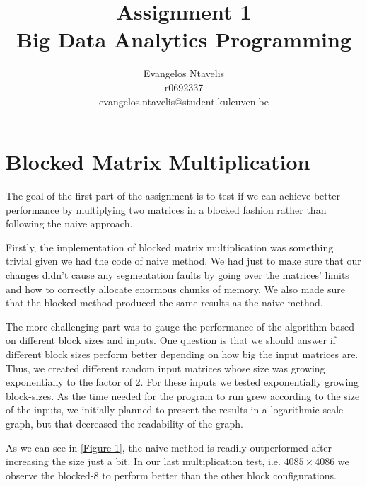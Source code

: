 \documentclass[12pt]{article}
\begin{document}
 
 
 
\title{Assignment 1\\
Big Data Analytics Programming} %
\author{Evangelos Ntavelis\\ %
r0692337 \\
evangelos.ntavelis@student.kuleuven.be}
 
\maketitle

\tableofcontents

\section{Blocked Matrix Multiplication}

The goal of the first part of the assignment is to test if we can achieve better performance by multiplying two matrices in a blocked fashion rather than following the naive approach. 

Firstly, the implementation of blocked matrix multiplication was something trivial given we had the code of naive method. We had just to make sure that our changes didn't cause any segmentation faults by going over the matrices' limits and how to correctly allocate enormous chunks of memory. We also made sure that the blocked method produced the same results as the naive method.

The more challenging part was to gauge the performance of the algorithm based on different block sizes and inputs. One question is that we should answer if different block sizes perform better depending on how big the input matrices are. Thus, we created different random input matrices whose size was growing exponentially to the factor of 2. For these inputs we tested exponentially growing block-sizes. As the time needed for the program to run grew according to the size of the inputs, we initially planned to present the results in a logarithmic scale graph, but that decreased the readability of the graph.

%

As we can see in \ref{Figure 1}, the naive method is readily outperformed after increasing the size just a bit. In our last multiplication test, i.e. $4085 \times 4086$ we observe the blocked-8 to perform better than the other block configurations.
\end{document}
